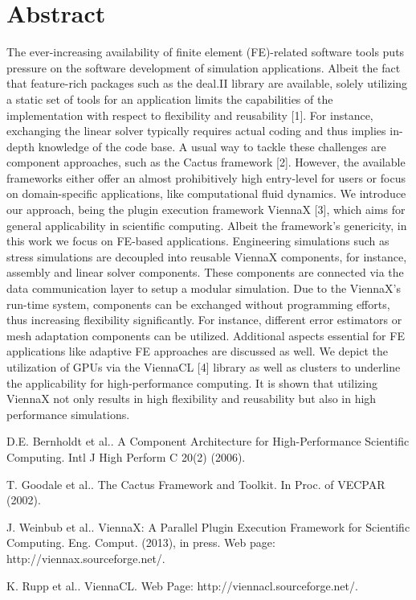 \documentclass[article,A4,11pt]{llncs}%
\begin{document}
\section*{Abstract}
The ever-increasing availability of finite element (FE)-related software tools puts pressure on the software development of simulation applications. Albeit the fact that feature-rich packages such as the deal.II library are available, solely utilizing a static set of tools for an application limits the capabilities of the implementation with respect to flexibility and reusability [1]. For instance, exchanging the linear solver typically requires actual coding and thus implies in-depth knowledge of the code base. A usual way to tackle these challenges are component approaches, such as the Cactus framework [2]. However, the available frameworks either offer an almost prohibitively high entry-level for users or focus on domain-specific applications, like computational fluid dynamics. We introduce our approach, being the plugin execution framework ViennaX [3], which aims for general applicability in scientific computing. Albeit the framework's genericity, in this work we focus on FE-based applications. Engineering simulations such as stress simulations are decoupled into reusable ViennaX components, for instance, assembly and linear solver components. These components are connected via the data communication layer to setup a modular simulation. Due to the ViennaX's run-time system, components can be exchanged without programming efforts, thus increasing flexibility significantly. For instance, different error estimators or mesh adaptation components can be utilized. Additional aspects essential for FE applications like adaptive FE approaches are discussed as well. We depict the utilization of GPUs via the ViennaCL [4] library as well as clusters to underline the applicability for high-performance computing. It is shown that utilizing ViennaX not only results in high flexibility and reusability but also in high performance simulations. 


\begin{thebibliography}{10}
{\sc D.E. Bernholdt et al.}. {A Component Architecture for High-Performance Scientific Computing}. Intl J High Perform C 20(2) (2006).

{\sc T. Goodale et al.}. {The Cactus Framework and Toolkit}. In Proc. of VECPAR (2002).

{\sc J. Weinbub et al.}. {ViennaX: A Parallel Plugin Execution Framework for Scientific Computing}. Eng. Comput. (2013), in press. Web page: http://viennax.sourceforge.net/.

{\sc K. Rupp et al.}. {ViennaCL}. Web Page: http://viennacl.sourceforge.net/.
\end{thebibliography}
\end{document}
